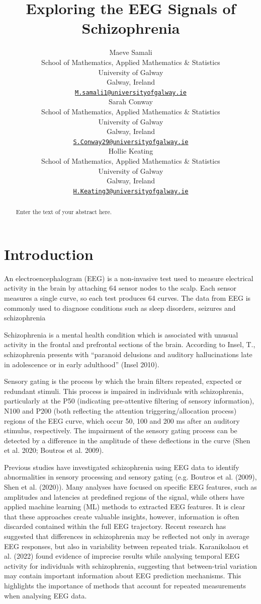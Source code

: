 \documentclass{article}
\title{Exploring the EEG Signals of Schizophrenia}
\author{
    Maeve Samali
   \\
    School of Mathematics, Applied Mathematics \& Statistics \\
    University of Galway \\
  Galway, Ireland \\
  \texttt{\href{mailto:M.samali1@universityofgalway.ie}{\nolinkurl{M.samali1@universityofgalway.ie}}} \\
   \And
    Sarah Conway
   \\
    School of Mathematics, Applied Mathematics \& Statistics \\
    University of Galway \\
  Galway, Ireland \\
  \texttt{\href{mailto:S.Conway29@universityofgalway.ie}{\nolinkurl{S.Conway29@universityofgalway.ie}}} \\
   \And
    Hollie Keating
   \\
    School of Mathematics, Applied Mathematics \& Statistics \\
    University of Galway \\
  Galway, Ireland \\
  \texttt{\href{mailto:H.Keating3@universityofgalway.ie}{\nolinkurl{H.Keating3@universityofgalway.ie}}} \\
  }
\begin{document}
\maketitle


\begin{abstract}
Enter the text of your abstract here.
\end{abstract}


\section{Introduction}\label{introduction}

\label{sec:intro}

An electroencephalogram (EEG) is a non-invasive test used to measure
electrical activity in the brain by attaching 64 sensor nodes to the
scalp. Each sensor measures a single curve, so each test produces 64
curves. The data from EEG is commonly used to diagnose conditions such
as sleep disorders, seizures and schizophrenia

Schizophrenia is a mental health condition which is associated with
unusual activity in the frontal and prefrontal sections of the brain.
According to Insel, T., schizophrenia presents with ``paranoid delusions
and auditory hallucinations late in adolescence or in early adulthood''
(Insel 2010).

Sensory gating is the process by which the brain filters repeated,
expected or redundant stimuli. This process is impaired in individuals
with schizophrenia, particularly at the P50 (indicating pre-attentive
filtering of sensory information), N100 and P200 (both reflecting the
attention triggering/allocation process) regions of the EEG curve, which
occur 50, 100 and 200 ms after an auditory stimulus, respectively. The
impairment of the sensory gating process can be detected by a difference
in the amplitude of these deflections in the curve (Shen et al. 2020;
Boutros et al. 2009).

Previous studies have investigated schizophrenia using EEG data to
identify abnormalities in sensory processing and sensory gating (e.g.
Boutros et al. (2009), Shen et al. (2020)). Many analyses have focused
on specific EEG features, such as amplitudes and latencies at predefined
regions of the signal, while others have applied machine learning (ML)
methods to extracted EEG features. It is clear that these approaches
create valuable insights, however, information is often discarded
contained within the full EEG trajectory. Recent research has suggested
that differences in schizophrenia may be reflected not only in average
EEG responses, but also in variability between repeated trials.
Karanikolaou et al. (2022) found evidence of imprecise results while
analysing temporal EEG activity for individuals with schizophrenia,
suggesting that between-trial variation may contain important
information about EEG prediction mechanisms. This highlights the
importance of methods that account for repeated measurements when
analysing EEG data.
\end{document}
